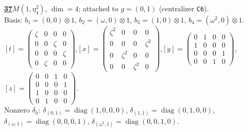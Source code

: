 \begin{samepage}\noindent\textbf{\underline{37}}\quad $M(1,\eta^{2}_{4})$, $\dim=4$; attached to $g=(0,1)$ (centralizer \texttt{C6}).\\
Basis: $b_{1}=(0,0)\otimes 1$, $b_{2}=(\omega,0)\otimes 1$, $b_{3}=(1,0)\otimes 1$, $b_{4}=(\omega^2,0)\otimes 1$.\\
$[t]=\left(\begin{smallmatrix} \zeta & 0 & 0 & 0 \\ 0 & 0 & \zeta & 0 \\ 0 & 0 & 0 & \zeta \\ 0 & \zeta & 0 & 0 \end{smallmatrix}\right)$,\quad $[x]=\left(\begin{smallmatrix} \zeta^2 & 0 & 0 & 0 \\ 0 & 0 & 0 & \zeta^2 \\ 0 & \zeta^2 & 0 & 0 \\ 0 & 0 & \zeta^2 & 0 \end{smallmatrix}\right)$,\quad $[y]=\left(\begin{smallmatrix} 0 & 1 & 0 & 0 \\ 1 & 0 & 0 & 0 \\ 0 & 0 & 0 & 1 \\ 0 & 0 & 1 & 0 \end{smallmatrix}\right)$,\quad $[z]=\left(\begin{smallmatrix} 0 & 0 & 1 & 0 \\ 0 & 0 & 0 & 1 \\ 1 & 0 & 0 & 0 \\ 0 & 1 & 0 & 0 \end{smallmatrix}\right)$.\\
Nonzero $\delta_h$: $\delta_{(0,1)}=\operatorname{diag}(1,0,0,0)$, $\delta_{(1,1)}=\operatorname{diag}(0,1,0,0)$, $\delta_{(\omega,1)}=\operatorname{diag}(0,0,0,1)$, $\delta_{(\omega^2,1)}=\operatorname{diag}(0,0,1,0)$.\end{samepage}
\medskip

